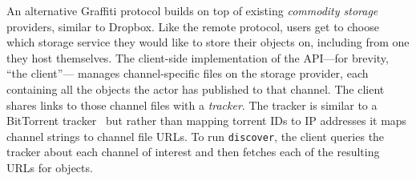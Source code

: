 An alternative Graffiti protocol builds on top of existing
\emph{commodity storage} providers,
similar to Dropbox.
Like the remote protocol, users get to choose which storage
service they would like to store their objects on, including
from one they host themselves.
The client-side implementation of the API---for brevity, ``the client''---%
manages channel-specific files on the storage provider,
each containing all the objects the actor has published to that channel.
The client shares links to those channel files with a \emph{tracker}.
The tracker is similar to a BitTorrent tracker~\cite{bittorrent} but
rather than mapping torrent IDs to IP addresses
it maps channel strings to channel file URLs.
To run \texttt{discover}, the client queries the tracker
about each channel of interest and then fetches each of the resulting URLs for objects.




